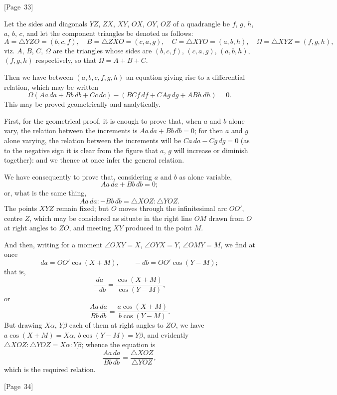 \documentclass[11pt,a4paper]{book}
\begin{document}
\begin{center}
[Page~33]
\end{center}

Let the sides and diagonals $YZ$, $ZX$, $XY$, $OX$, $OY$, $OZ$ of a
quadrangle be $f$, $g$, $h$, $a$, $b$, $c$, and let the component triangles
be denoted as follows:
\[
A = \triangle YZO = (b,c,f), \quad
B = \triangle ZX O = (c,a,g), \quad
C = \triangle XY O = (a,b,h), \quad
\Omega = \triangle XYZ = (f,g,h),
\]
viz. $A$, $B$, $C$, $\Omega$ are the triangles whose sides are
$(b,c,f)$, $(c,a,g)$, $(a,b,h)$, $(f,g,h)$ respectively,
so that $\Omega = A + B + C$.

Then we have between $(a,b,c,f,g,h)$ an equation giving rise to a
differential relation, which may be written
\[
\Omega(Aa\,da + Bb\,db + Cc\,dc) - (BCf\,df + CAg\,dg + ABh\,dh) = 0.
\]
This may be proved geometrically and analytically.

First, for the geometrical proof, it is enough to prove that, when
$a$ and $b$ alone vary, the relation between the increments is
$Aa\,da + Bb\,db = 0$;
for then $a$ and $g$ alone varying, the relation between the increments
will be $Ca\,da - Cg\,dg = 0$
(as to the negative sign it is clear from the figure that $a$, $g$
will increase or diminish together):
and we thence at once infer the general relation.

We have consequently to prove that, considering $a$ and $b$ as alone
variable,
\[
Aa\,da + Bb\,db = 0;
\]
or, what is the same thing,
\[
Aa\,da : -Bb\,db = \triangle XOZ : \triangle YOZ.
\]
The points $XYZ$ remain fixed; but $O$ moves through the infinitesimal
arc $OO'$, centre $Z$, which may be considered as situate in the right
line $OM$ drawn from $O$ at right angles to $ZO$, and meeting $XY$
produced in the point $M$.

And then, writing for a moment $\angle OXY = X$, $\angle OYX = Y$,
$\angle OMY = M$, we find at once
\[
da = OO' \cos(X+M), \qquad -db = OO' \cos(Y-M);
\]
that is,
\[
\frac{da}{-db} = \frac{\cos(X+M)}{\cos(Y-M)},
\]
or
\[
\frac{Aa\,da}{Bb\,db} = \frac{a\cos(X+M)}{b\cos(Y-M)}.
\]
But drawing $X\alpha$, $Y\beta$ each of them at right angles to $ZO$, we
have $a\cos(X+M) = X\alpha$, $b\cos(Y-M) = Y\beta$, and evidently
$\triangle XOZ : \triangle YOZ = X\alpha : Y\beta$;
whence the equation is
\[
\frac{Aa\,da}{Bb\,db} = \frac{\triangle XOZ}{\triangle YOZ},
\]
which is the required relation.

\begin{center}
[Page~34]
\end{center}
\end{document}
